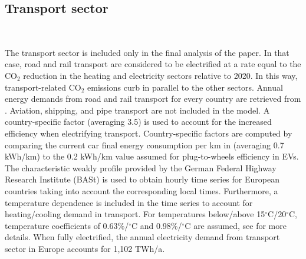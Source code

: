 \documentclass[3p]{elsarticle} %
\begin{document}

\FloatBarrier

\subsection{Transport sector} \label{sec_transport}\

The transport sector is included only in the final analysis of the paper. In that case, road and rail transport are considered to be electrified at a rate equal to the CO$_2$ reduction in the heating and electricity sectors relative to 2020. In this way, transport-related CO$_2$ emissions curb in parallel to the other sectors. Annual energy demands from road and rail transport for every country are retrieved from \cite{ODYSSEE}. Aviation, shipping, and pipe transport are not included in the model.  A country-specific factor (averaging 3.5) is used to account for the increased efficiency when electrifying transport. Country-specific factors are computed by comparing the current car final energy consumption per km in \cite{ODYSSEE} (averaging 0.7 kWh/km) to the 0.2 kWh/km value assumed for plug-to-wheels efficiency in EVs. The characteristic weakly profile provided by the German Federal Highway Research Institute (BASt) \cite{BASt} is used to obtain hourly time series for European countries taking into account the corresponding local times. Furthermore, a temperature dependence is included in the time series to account for heating/cooling demand in transport. For temperatures below/above 15$^{\circ}$C/20$^{\circ}$C, temperature coefficients of 0.63\%/$^{\circ}$C and 0.98\%/$^{\circ}$C are assumed, see \cite{Brown_2018} for more details. When fully electrified, the annual electricity demand from transport sector in Europe accounts for 1,102 TWh/a. 
\end{document}
